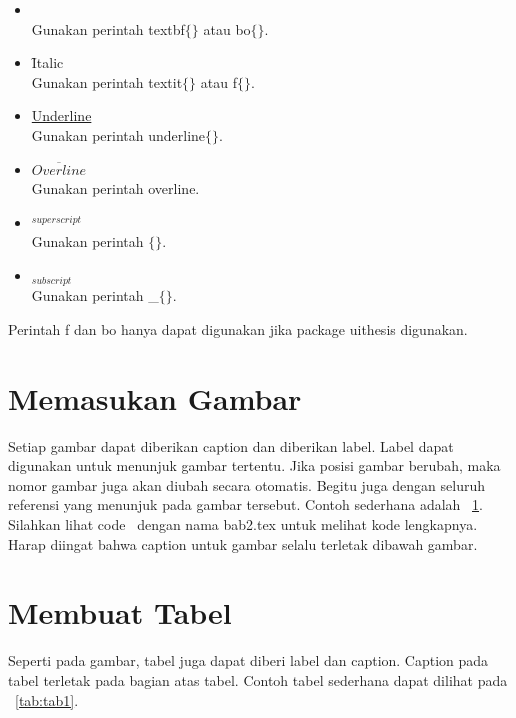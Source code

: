\begin{itemize}
	\item {} \\
		Gunakan perintah \bslash textbf$\lbrace\rbrace$ atau 
		\bslash bo$\lbrace\rbrace$. 
	\item \f{Italic} \\
		Gunakan perintah \bslash textit$\lbrace\rbrace$ atau 
		\bslash f$\lbrace\rbrace$. 
	\item \underline{Underline} \\
		Gunakan perintah \bslash underline$\lbrace\rbrace$.
	\item $\overline{Overline}$ \\
		Gunakan perintah \bslash overline. 
	\item $^{superscript}$ \\
		Gunakan perintah \bslash $\lbrace\rbrace$. 
	\item $_{subscript}$ \\
		Gunakan perintah \bslash \_$\lbrace\rbrace$. 
\end{itemize}

Perintah \bslash f dan \bslash bo hanya dapat digunakan jika package 
uithesis digunakan. 


\section{Memasukan Gambar}
Setiap gambar dapat diberikan caption dan diberikan label. Label dapat 
digunakan untuk menunjuk gambar tertentu. 
Jika posisi gambar berubah, maka nomor gambar juga akan diubah secara 
otomatis. 
Begitu juga dengan seluruh referensi yang menunjuk pada gambar tersebut. 
Contoh sederhana adalah \pic~\ref{fig:testGambar}. 
Silahkan lihat code \latex~dengan nama bab2.tex untuk melihat kode lengkapnya. 
Harap diingat bahwa caption untuk gambar selalu terletak dibawah gambar. 

\begin{figure}
	\centering
	\label{fig:testGambar}
\end{figure}


\section{Membuat Tabel}
Seperti pada gambar, tabel juga dapat diberi label dan caption. 
Caption pada tabel terletak pada bagian atas tabel. 
Contoh tabel sederhana dapat dilihat pada \tab~\ref{tab:tab1}.


